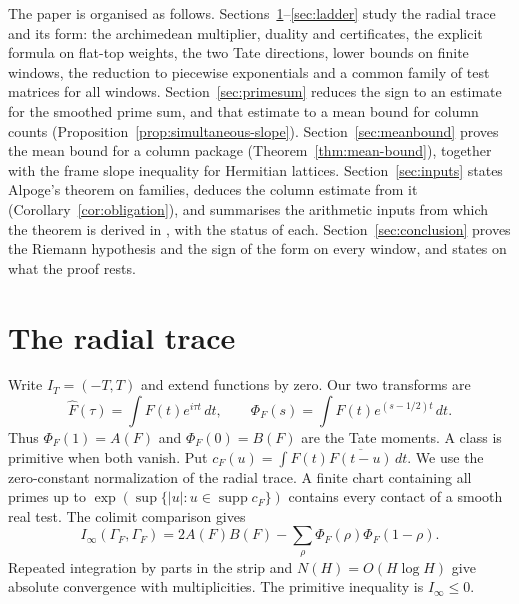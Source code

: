 \documentclass[10pt]{amsart}
\theoremstyle{definition}
\theoremstyle{remark}
\newcommand{\supp}{\operatorname{supp}}
\begin{document}
The paper is organised as follows. Sections~\ref{sec:trace}--\ref{sec:ladder}
study the radial trace and its form: the archimedean multiplier, duality and
certificates, the explicit formula on flat-top weights, the two Tate
directions, lower bounds on finite windows, the reduction to piecewise
exponentials and a common family of test matrices for all windows.
Section~\ref{sec:primesum} reduces the sign to an estimate for the smoothed
prime sum, and that estimate to a mean bound for column counts
(Proposition~\ref{prop:simultaneous-slope}). Section~\ref{sec:meanbound}
proves the mean bound for a column package (Theorem~\ref{thm:mean-bound}),
together with the frame slope inequality for Hermitian lattices.
Section~\ref{sec:inputs} states Alpoge's theorem on families, deduces the
column estimate from it (Corollary~\ref{cor:obligation}), and summarises the
arithmetic inputs from which the theorem is derived in \cite{Annex}, with
the status of each. Section~\ref{sec:conclusion} proves the Riemann
hypothesis and the sign of the form on every window, and states on what the
proof rests.

\section{The radial trace}\label{sec:trace}
Write $I_T=(-T,T)$ and extend functions by zero. Our two transforms are
\[
 \widehat F(\tau)=\int F(t)e^{i\tau t}\,dt,\qquad
 \Phi_F(s)=\int F(t)e^{(s-1/2)t}\,dt .
\]
Thus $\Phi_F(1)=A(F)$ and $\Phi_F(0)=B(F)$ are the Tate moments.
A class is primitive when both vanish. Put
$c_F(u)=\int F(t)\overline{F(t-u)}\,dt$.
We use the zero-constant normalization of the radial trace. A finite chart containing all primes up to
$\exp(\sup\{|u|:u\in\supp c_F\})$ contains every contact of a smooth
real test. The colimit comparison \cite[Theorem~4.1]{Paper45} gives
\begin{equation}\label{comparison}
 I_\infty(\Gamma_F,\Gamma_F)
 =2A(F)B(F)-\sum_\rho\Phi_F(\rho)\Phi_F(1-\rho).
\end{equation}
Repeated integration by parts in the strip and $N(H)=O(H\log H)$ give
absolute convergence with multiplicities. The primitive inequality is $I_\infty\le0$.
\end{document}
